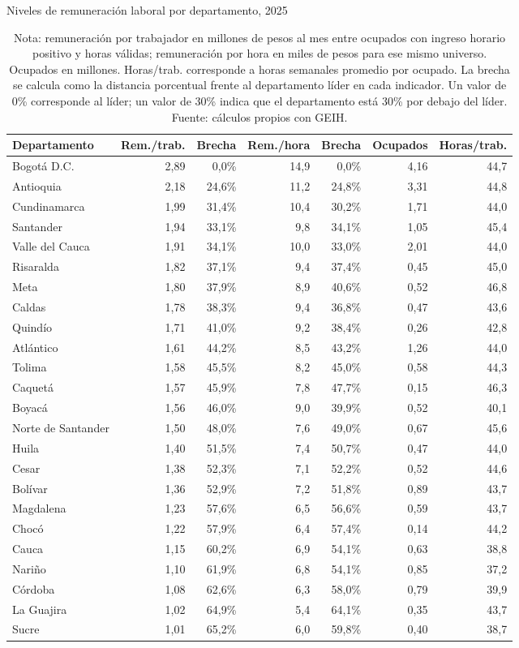 \begin{table}[H]
\centering
\caption{Niveles de remuneración laboral por departamento, 2025}
\label{tab:dept_remuneracion_niveles_24}
\scriptsize
\begin{tabular}{lrrrrrr}
\toprule
Departamento & Rem./trab. & Brecha & Rem./hora & Brecha & Ocupados & Horas/trab. \\
\midrule
Bogotá D.C. & 2,89 & 0,0\% & 14,9 & 0,0\% & 4,16 & 44,7 \\
Antioquia & 2,18 & 24,6\% & 11,2 & 24,8\% & 3,31 & 44,8 \\
Cundinamarca & 1,99 & 31,4\% & 10,4 & 30,2\% & 1,71 & 44,0 \\
Santander & 1,94 & 33,1\% & 9,8 & 34,1\% & 1,05 & 45,4 \\
Valle del Cauca & 1,91 & 34,1\% & 10,0 & 33,0\% & 2,01 & 44,0 \\
Risaralda & 1,82 & 37,1\% & 9,4 & 37,4\% & 0,45 & 45,0 \\
Meta & 1,80 & 37,9\% & 8,9 & 40,6\% & 0,52 & 46,8 \\
Caldas & 1,78 & 38,3\% & 9,4 & 36,8\% & 0,47 & 43,6 \\
Quindío & 1,71 & 41,0\% & 9,2 & 38,4\% & 0,26 & 42,8 \\
Atlántico & 1,61 & 44,2\% & 8,5 & 43,2\% & 1,26 & 44,0 \\
Tolima & 1,58 & 45,5\% & 8,2 & 45,0\% & 0,58 & 44,3 \\
Caquetá & 1,57 & 45,9\% & 7,8 & 47,7\% & 0,15 & 46,3 \\
Boyacá & 1,56 & 46,0\% & 9,0 & 39,9\% & 0,52 & 40,1 \\
Norte de Santander & 1,50 & 48,0\% & 7,6 & 49,0\% & 0,67 & 45,6 \\
Huila & 1,40 & 51,5\% & 7,4 & 50,7\% & 0,47 & 44,0 \\
Cesar & 1,38 & 52,3\% & 7,1 & 52,2\% & 0,52 & 44,6 \\
Bolívar & 1,36 & 52,9\% & 7,2 & 51,8\% & 0,89 & 43,7 \\
Magdalena & 1,23 & 57,6\% & 6,5 & 56,6\% & 0,59 & 43,7 \\
Chocó & 1,22 & 57,9\% & 6,4 & 57,4\% & 0,14 & 44,2 \\
Cauca & 1,15 & 60,2\% & 6,9 & 54,1\% & 0,63 & 38,8 \\
Nariño & 1,10 & 61,9\% & 6,8 & 54,1\% & 0,85 & 37,2 \\
Córdoba & 1,08 & 62,6\% & 6,3 & 58,0\% & 0,79 & 39,9 \\
La Guajira & 1,02 & 64,9\% & 5,4 & 64,1\% & 0,35 & 43,7 \\
Sucre & 1,01 & 65,2\% & 6,0 & 59,8\% & 0,40 & 38,7 \\
\bottomrule
\end{tabular}
\caption*{\footnotesize Nota: remuneración por trabajador en millones de pesos al mes entre ocupados con ingreso horario positivo y horas válidas; remuneración por hora en miles de pesos para ese mismo universo. Ocupados en millones. Horas/trab. corresponde a horas semanales promedio por ocupado. La brecha se calcula como la distancia porcentual frente al departamento líder en cada indicador. Un valor de 0\% corresponde al líder; un valor de 30\% indica que el departamento está 30\% por debajo del líder. Fuente: cálculos propios con GEIH.}
\end{table}
